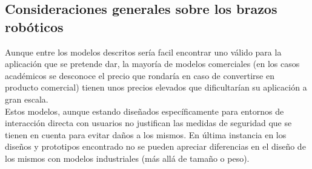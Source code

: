      \vspace{0.1cm}
 \subsection{Consideraciones generales sobre los brazos robóticos}
    Aunque entre los modelos descritos sería facil encontrar uno válido para la aplicación que se pretende dar, la mayoría de modelos comerciales (en los casos académicos se desconoce el precio que rondaría en caso de convertirse en producto comercial) tienen unos precios elevados que dificultarían su aplicación a gran escala.
    \\

    Estos modelos, aunque estando diseñados específicamente para entornos de interacción directa con usuarios no justifican las medidas de seguridad que se tienen en cuenta para evitar daños a los mismos. En última instancia en los diseños y prototipos encontrado no se pueden apreciar diferencias en el diseño de los mismos con modelos industriales (más allá de tamaño o peso).
